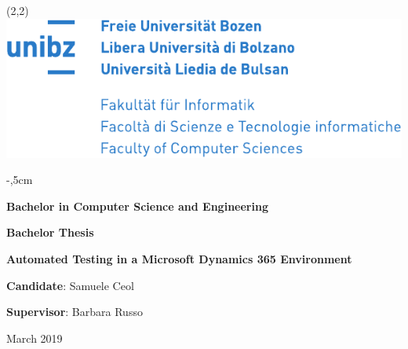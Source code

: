 \documentclass[10pt,a4paper,twoside]{book}
\begin{document}
\frontmatter

\newenvironment{tight_enumerate}{
\begin{enumerate}
  \setlength{\itemsep}{0pt}  
  \setlength{\parskip}{0pt}
}{\end{enumerate}}

\newenvironment{tight_itemize}{
\begin{itemize}
  \setlength{\itemsep}{0pt}
  \setlength{\parskip}{0pt}
}{\end{itemize}}

\newcommand{\wtf}[1]{{\color{red}#1}}

\def\author{Samuele Ceol}
\def\advisor{Barbara Russo}
\def\date{March 2019}

\def\tableheader{Continued from previous page}
\def\tablefooter{Continues on next page}

\begin{titlepage}

  \begin{textblock}{20}(2,2)
    \includegraphics[scale=1.16]{Images/logo.pdf}
  \end{textblock}
  
  {\vspace*{100pt}\parindent0pt\large
  
  \begin{addmargin}[1.6cm]{-,5cm}
  \textbf{}
  
  \vspace{2cm}
  {\fontsize{15pt}{18pt}\hspace{-3pt}\selectfont\textbf{Bachelor in Computer Science and Engineering}}
  \vspace{1,5cm}

  {\fontsize{15pt}{18pt}\textbf{Bachelor Thesis}}
  \vspace{0,5cm}

  {\fontsize{23pt}{21pt}\textbf{Automated Testing in a Microsoft \newline Dynamics 365 Environment}}

  \vspace{5cm}
  \Large{\textbf{Candidate}: \author}

  \vspace{1cm}
  \textbf{Supervisor}: \advisor

  \vspace{1cm}
  
  \date
  
  \end{addmargin} 
  }

\end{titlepage}
\end{document}
